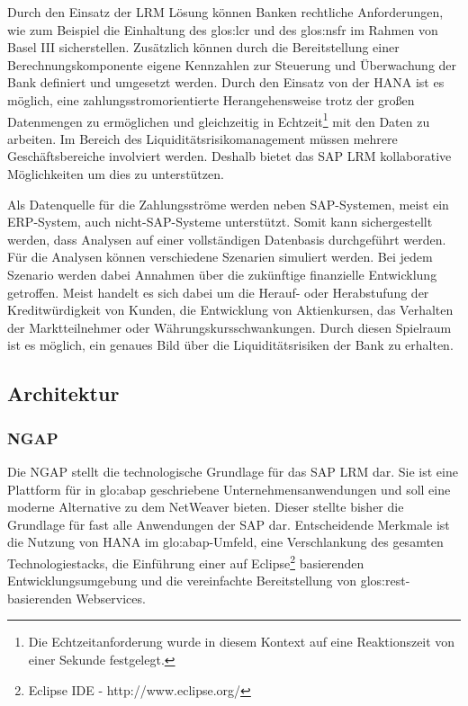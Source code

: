 \begin{onehalfspacing}
Durch den Einsatz der LRM Lösung können Banken rechtliche Anforderungen, wie zum Beispiel die Einhaltung des \gls{glos:lcr} und des \gls{glos:nsfr} im Rahmen von Basel III sicherstellen. Zusätzlich können durch die Bereitstellung einer Berechnungskomponente eigene Kennzahlen zur Steuerung und Überwachung der Bank definiert und umgesetzt werden. Durch den Einsatz von der \gls{HANA} ist es möglich, eine zahlungsstromorientierte Herangehensweise trotz der großen Datenmengen zu ermöglichen und gleichzeitig in Echtzeit\footnote{Die Echtzeitanforderung wurde in diesem Kontext auf eine Reaktionszeit von einer Sekunde festgelegt.} mit den Daten zu arbeiten. Im Bereich des Liquiditätsrisikomanagement müssen mehrere Geschäftsbereiche involviert werden. Deshalb bietet das SAP LRM kollaborative Möglichkeiten um dies zu unterstützen.

Als Datenquelle für die Zahlungsströme werden neben SAP-Systemen, meist ein \gls{ERP}-System, auch nicht-SAP-Systeme unterstützt. Somit kann sichergestellt werden, dass Analysen auf einer vollständigen Datenbasis durchgeführt werden. Für die Analysen können verschiedene Szenarien simuliert werden. Bei jedem Szenario werden dabei Annahmen über die zukünftige finanzielle Entwicklung getroffen. Meist handelt es sich dabei um die Herauf- oder Herabstufung der Kreditwürdigkeit von Kunden, die Entwicklung von Aktienkursen, das Verhalten der Marktteilnehmer oder Währungskursschwankungen. Durch diesen Spielraum ist es möglich, ein genaues Bild über die Liquiditätsrisiken der Bank zu erhalten.


\subsection{Architektur}

\subsubsection{NGAP}
Die \gls{NGAP} stellt die technologische Grundlage für das SAP LRM dar. Sie ist eine Plattform für in \gls{glo:abap} geschriebene Unternehmensanwendungen und soll eine moderne Alternative zu dem \gls{NetWeaver} bieten. Dieser stellte bisher die Grundlage für fast alle Anwendungen der SAP dar. Entscheidende Merkmale ist die Nutzung von \gls{HANA} im \gls{glo:abap}-Umfeld, eine Verschlankung des gesamten Technologiestacks, die Einführung einer auf Eclipse\footnote{Eclipse IDE - http://www.eclipse.org/} basierenden Entwicklungsumgebung und die vereinfachte Bereitstellung von \gls{glos:rest}-basierenden Webservices.


\end{onehalfspacing}
